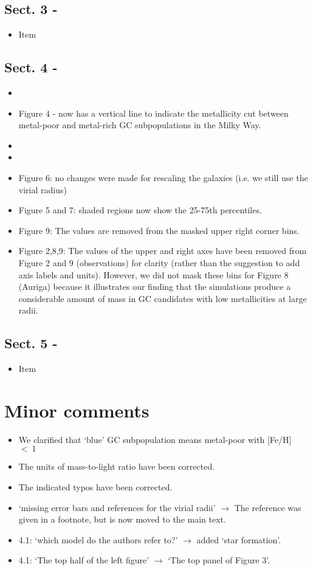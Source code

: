 \documentclass{article}
\begin{document}
\subsection*{Sect. 3 -}
\begin{itemize}
\item Item 
\end{itemize}

\subsection*{Sect. 4 -}
\begin{itemize}
\item
\item Figure 4 - now has a vertical line to indicate the metallicity cut 
between metal-poor and metal-rich GC subpopulations in the Milky Way.
\item
\item
\item Figure 6: no changes were made for rescaling the galaxies (i.e. we still
use the virial radius)
\item Figure 5 and 7: shaded regions now show the 25-75th percentiles.
\item Figure 9: The values are removed from the masked upper right corner bins.
\item Figure 2,8,9: The values of the upper and right axes have been removed from
Figure 2 and 9 (observations) for clarity (rather than the suggestion to add 
axis labels and units). However, we did not mask these bins for Figure 8 (Auriga)
because it illustrates our finding that the simulations produce a considerable
amount of mass in GC candidates with low metallicities at large radii.
\end{itemize}

\subsection*{Sect. 5 -}
\begin{itemize}
\item Item
\end{itemize}



\section*{Minor comments}
\begin{itemize}
\item We clarified that `blue' GC subpopulation means metal-poor with [Fe/H]~$<~1$
\item The units of mass-to-light ratio have been corrected.
\item The indicated typos have been corrected.
\item `missing error bars and references for the virial radii' $\rightarrow$
    The reference was given in a footnote, but is now moved to the main text.
\item 4.1: `which model do the authors refer to?' $\rightarrow$ 
    added `star formation'.
\item 4.1: `The top half of the left figure' $\rightarrow$ 
    `The top panel of Figure 3'.
\end{itemize}
\end{document}
